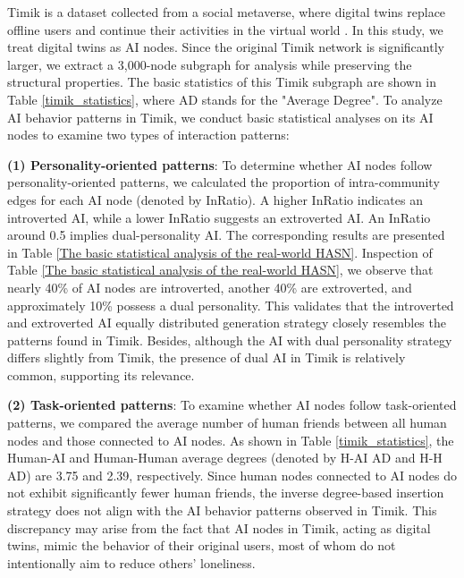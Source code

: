 Timik is a dataset collected from a social metaverse, where digital twins replace offline users and continue their activities in the virtual world \cite{chen2022user}. In this study, we treat digital twins as AI nodes. Since the original Timik network is significantly larger, we extract a 3,000-node subgraph for analysis while preserving the structural properties. The basic statistics of this Timik subgraph are shown in Table \ref{timik_statistics}, where AD stands for the "Average Degree". To analyze AI behavior patterns in Timik, we conduct basic statistical analyses on its AI nodes to examine two types of interaction patterns:

\noindent \textbf{(1) Personality-oriented patterns}: To determine whether AI nodes follow personality-oriented patterns, we calculated the proportion of intra-community edges for each AI node (denoted by InRatio). A higher InRatio indicates an introverted AI, while a lower InRatio suggests an extroverted AI. An InRatio around 0.5 implies dual-personality AI. The corresponding results are presented in Table \ref{The basic statistical analysis of the real-world HASN}.  Inspection of Table \ref{The basic statistical analysis of the real-world HASN}, we observe that nearly 40\% of AI nodes are introverted, another 40\% are extroverted, and approximately 10\% possess a dual personality. This validates that the introverted and extroverted AI equally distributed generation strategy closely resembles the patterns found in Timik. Besides, although the AI with dual personality strategy differs slightly from Timik, the presence of dual AI in Timik is relatively common, supporting its relevance. 

\noindent \textbf{(2) Task-oriented patterns}: To examine whether AI nodes follow task-oriented patterns, we compared the average number of human friends between all human nodes and those connected to AI nodes.  As shown in Table \ref{timik_statistics}, the Human-AI and Human-Human average degrees (denoted by H-AI AD and H-H AD) are 3.75 and 2.39, respectively. Since human nodes connected to AI nodes do not exhibit significantly fewer human friends, the inverse degree-based insertion strategy does not align with the AI behavior patterns observed in Timik. This discrepancy may arise from the fact that AI nodes in Timik, acting as digital twins, mimic the behavior of their original users, most of whom do not intentionally aim to reduce others' loneliness.



